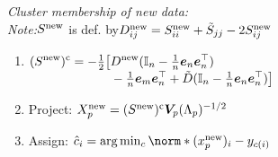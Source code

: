 \columnbreak
\emph{Cluster membership of new data:}\\
\textit{Note:}\enspace $S^\mathrm{new}$ is def. by\enspace $D_{ij}^\mathrm{new} = S_{ii}^\mathrm{new} + \tilde S_{jj} - 2 S_{ij}^\mathrm{new}$
\begin{enumerate}
    \item $\begin{aligned}[t]
        (S^\mathrm{new})^\mathrm{c} = -\tfrac12 \big[ &
            D^\mathrm{new} (\mathbb I_n - \tfrac1n \bm e_n \bm e_n^\top)
        \\[-3pt] &
            - \tfrac1n \bm e_m \bm e_n^\top + \tilde D (\mathbb I_n - \tfrac1n \bm e_n \bm e_n^\top) \big]
    \end{aligned}$
    \item Project:
        \enspace $X_p^\mathrm{new} = (S^\mathrm{new})^\mathrm{c} \bm V_p (\Lambda_p)^{-1/2}$
    \item Assign:
        \enskip $\hat c_i = \arg\min_c \norm*{(x_p\ap{new})_i - y_{c(i)}}$
\end{enumerate}

\iffalse
    \subsection{Alternative Costs}
    \todo{}
\fi


